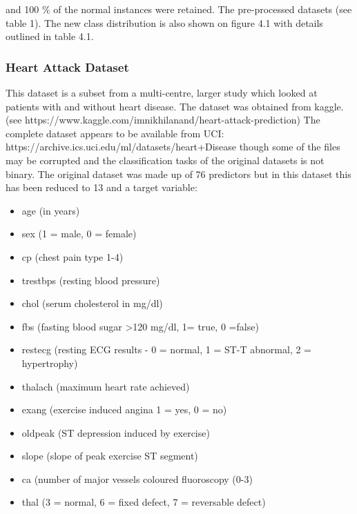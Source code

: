 and 100 \% of the normal instances were retained. The pre-processed datasets (see table 1). The new class distribution is also shown on figure 4.1 with details outlined in table 4.1.\newline

\subsubsection{Heart Attack Dataset}
This dataset is a subset from a multi-centre, larger study which looked at patients with and without heart disease. The dataset was obtained from kaggle.\newline 
(see https://www.kaggle.com/imnikhilanand/heart-attack-prediction) \newline
The complete dataset appears to be available from UCI:\newline
https://archive.ics.uci.edu/ml/datasets/heart+Disease \newline 
though some of the files may be corrupted and the classification tasks of the original datasets is not binary.
The original dataset was made up of 76 predictors but in this dataset this has been reduced to 13 and a target variable:
\begin{itemize}
    \item age (in years)
    \item sex (1 = male, 0 = female) 
    \item cp (chest pain type 1-4)
    \item trestbps (resting blood pressure)
    \item chol (serum cholesterol in mg/dl) 
    \item fbs (fasting blood sugar >120 mg/dl, 1= true, 0 =false) 
    \item restecg (resting ECG results - 0 = normal, 1 = ST-T abnormal, 2 = hypertrophy)
    \item thalach (maximum heart rate achieved)
    \item exang (exercise induced angina 1 = yes, 0 = no)
    \item oldpeak (ST depression induced by exercise)
    \item slope (slope of peak exercise ST segment)
    \item ca (number of major vessels coloured fluoroscopy (0-3) 
    \item thal (3 = normal, 6 = fixed defect, 7 = reversable defect) 
\end{itemize}

